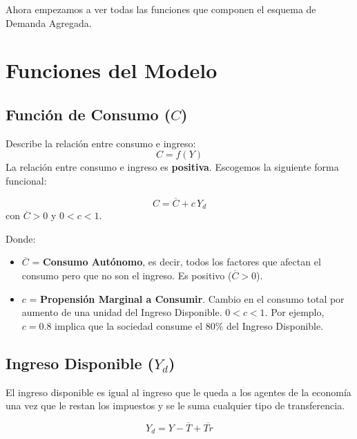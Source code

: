 \documentclass[11pt,a4paper]{article}
\newcommand{\barvar}[1]{\overline{#1}}
\begin{document}
Ahora empezamos a ver todas las funciones que componen el esquema de Demanda Agregada.

\section{Funciones del Modelo}

\subsection{Función de Consumo ($C$)}

Describe la relación entre consumo e ingreso:
\[
    C = f(Y)
\]
La relación entre consumo e ingreso es \textbf{positiva}. Escogemos la siguiente forma funcional:

\begin{resultadobox}
\begin{equation}
    C = \barvar{C} + c \, Y_d \tag{3}
\end{equation}
con $\barvar{C} > 0$ y $0 < c < 1$.
\end{resultadobox}

Donde:
\begin{itemize}
    \item $\barvar{C}$ = \textbf{Consumo Autónomo}, es decir, todos los factores que afectan el consumo pero que no son el ingreso. Es positivo ($\barvar{C} > 0$).
    \item $c$ = \textbf{Propensión Marginal a Consumir}. Cambio en el consumo total por aumento de una unidad del Ingreso Disponible. $0 < c < 1$. Por ejemplo, $c = 0.8$ implica que la sociedad consume el 80\% del Ingreso Disponible.
\end{itemize}

\subsection{Ingreso Disponible ($Y_d$)}

El ingreso disponible es igual al ingreso que le queda a los agentes de la economía una vez que le restan los impuestos y se le suma cualquier tipo de transferencia.

\begin{resultadobox}
\begin{equation}
    Y_d = Y - \barvar{T} + \barvar{Tr} \tag{4}
\end{equation}
\end{resultadobox}
\end{document}
